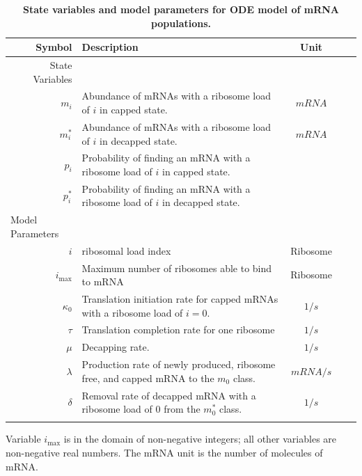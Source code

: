 \documentclass[10pt,letterpaper]{article}
\newcommand{\imax}{\ensuremath{{i_{\max}}}\xspace}
\begin{document}
\begin{table}[!ht]
  \begin{adjustwidth}{-2.25in}{0in} 
    \centering
    \caption{{\bf State variables and model parameters for ODE model of mRNA populations.}}
    \begin{tabular}{|rp{4in}|c|c|c|}
      \hline
      \textbf{Symbol}&\textbf{Description}&\textbf{Unit} \\\hline
      State Variables & &  \\ 
      \hline \hline
      $m_i$ & Abundance of mRNAs with a ribosome load of $i$ in capped state. & $mRNA$ \\
      $m_i^*$ & Abundance of mRNAs with a ribosome load of $i$ in decapped state. & $mRNA$ \\ \hline
      $p_i$ & Probability of finding an mRNA with a ribosome load of $i$ in capped state. & \\
      $p_i^*$ & Probability of finding an mRNA with a ribosome load of $i$ in decapped state. &  \\ \hline
      \multicolumn{1}{|l|}{Model Parameters} \\ \hline \hline
      $i$ & ribosomal load index & Ribosome\\
      \imax & Maximum number of ribosomes able to bind to mRNA & Ribosome \\
      $\kappa_0$ & Translation initiation rate for capped mRNAs with a ribosome load of $i=0$. & $1/s$\\
      $\tau$ & Translation completion rate for one ribosome & $1/s$\\
      $\mu $ & Decapping rate. & $1/s$\\
      $\lambda$ & Production rate of newly produced, ribosome free, and capped mRNA to the $m_0$ class. & $mRNA/s$\\
      $\delta$ & Removal rate of decapped mRNA with a ribosome load of 0 from the $m_0^*$ class. & $1/s$\\ \hline 
      \\ \hline
    \end{tabular}
    \begin{flushleft}
      Variable \imax is in the domain of non-negative integers; all other variables are non-negative real numbers.
      The mRNA unit is the number of molecules of mRNA.
    \end{flushleft}
    \label{tab:params}
  \end{adjustwidth}
\end{table}
\end{document}
